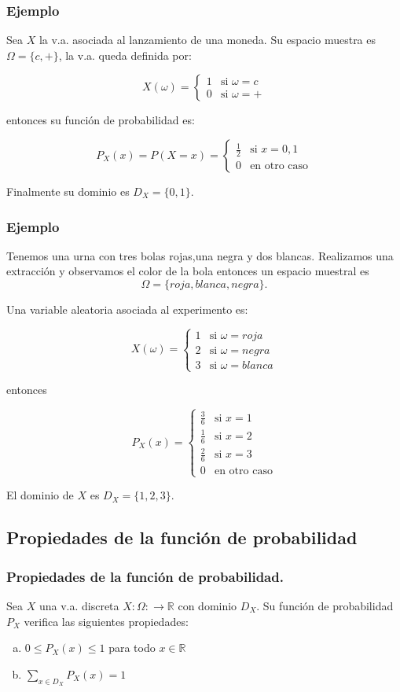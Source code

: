\documentclass[handout]{beamer}\usepackage[]{graphicx}\usepackage[]{color}
\newcommand{\RR}{\mathbb{R}}
\renewcommand{\leq}{\leqslant}
\theoremstyle{plain}
\theoremstyle{definition}
\begin{document}
\begin{frame}

\frametitle{Ejemplo}
Sea $X$ la v.a. asociada al lanzamiento de una moneda. Su espacio muestra es  $\Omega=\{c,+\}$, la v.a. queda definida por:

$$X(\omega)=\left\{\begin{array}{ll} 1 & \mbox{si } \omega=c \\
0 & \mbox{si }\omega=+\end{array}\right.$$

entonces su función de probabilidad es:

$$P_{X}(x)=P(X=x)=\left\{\begin{array}{ll} \frac{1}{2} & \mbox{si } x=0,1\\
0 & \mbox{en otro caso}\end{array}\right.$$


Finalmente su dominio es $D_X=\{0,1\}.$
\end{frame}



\begin{frame}
\frametitle{Ejemplo} 
Tenemos una urna con tres bolas rojas,una negra y dos blancas. Realizamos una extracción y observamos el color de la bola entonces un espacio muestral es
$$\Omega=\{roja, blanca, negra\}.$$ 

Una variable aleatoria asociada al experimento es:

$$X(\omega)=\left\{\begin{array}{ll} 1 & \mbox{si } \omega=roja  \\
2 & \mbox{si }\omega=negra \\ 3 & \mbox{si } \omega=blanca \end{array}\right.$$

entonces

$$P_{X}(x)=\left\{\begin{array}{ll} \frac{3}{6} & \mbox{si } x=1\\
\frac{1}{6} & \mbox{si } x=2\\ \frac{2}{6} & \mbox{si } x=3\\ 0 & \mbox{en otro
caso}\end{array}\right.$$

El dominio de $X$ es $D_X=\{1,2,3\}.$

\end{frame}

\subsection{Propiedades de la función de probabilidad}
\begin{frame}

\frametitle{Propiedades de la función de probabilidad.}
 Sea $X$ una v.a. discreta $X:\Omega:\to\RR$ con dominio $D_X$. Su función de probabilidad $P_{X}$ verifica las siguientes propiedades:
\begin{enumerate}[a)]
\item $0\leq P_{X}(x)\leq 1$ para todo $x\in\RR$
\item $\sum\limits_{x\in D_X} P_{X}(x)=1$
\end{enumerate}
\end{frame}
\end{document}
